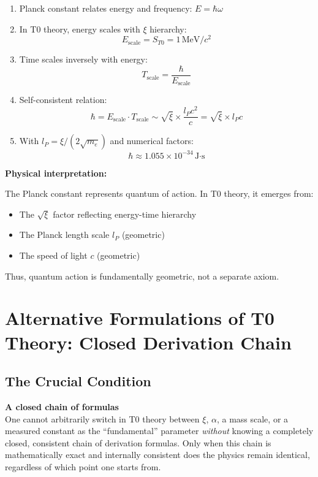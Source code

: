 	\begin{enumerate}
		\item Planck constant relates energy and frequency: $E = \hbar \omega$
		
		\item In T0 theory, energy scales with $\xi$ hierarchy:
		\[
		E_{\text{scale}} = S_{T0} = 1\,\text{MeV}/c^2
		\]
		
		\item Time scales inversely with energy:
		\[
		T_{\text{scale}} = \frac{\hbar}{E_{\text{scale}}}
		\]
		
		\item Self-consistent relation:
		\[
		\hbar = E_{\text{scale}} \cdot T_{\text{scale}} \sim \sqrt{\xi} \times \frac{l_P c^2}{c} = \sqrt{\xi} \times l_P c
		\]
		
		\item With $l_P = \xi/(2\sqrt{m_e})$ and numerical factors:
		\[
		\hbar \approx 1.055 \times 10^{-34}\,\text{J·s}
		\]
	\end{enumerate}
	
	\textbf{Physical interpretation:}
	
	The Planck constant represents quantum of action. In T0 theory, it emerges from:
	\begin{itemize}
		\item The $\sqrt{\xi}$ factor reflecting energy-time hierarchy
		\item The Planck length scale $l_P$ (geometric)
		\item The speed of light $c$ (geometric)
	\end{itemize}
	
	Thus, quantum action is fundamentally geometric, not a separate axiom.
	
	\section{Alternative Formulations of T0 Theory: Closed Derivation Chain}\label{sec:alternative_formulations}
	
	\subsection{The Crucial Condition}
	
	\begin{keyresult}
		\textbf{A closed chain of formulas}\\
		One cannot arbitrarily switch in T0 theory between $\xi$, $\alpha$, a mass scale, or a measured constant as the ``fundamental'' parameter \emph{without} knowing a completely closed, consistent chain of derivation formulas. Only when this chain is mathematically exact and internally consistent does the physics remain identical, regardless of which point one starts from.
	\end{keyresult}
	
